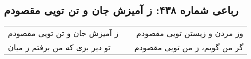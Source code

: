 \begin{center}
\section*{رباعی شماره ۴۳۸: ز آمیزش جان و تن تویی مقصودم}
\label{sec:sh438}
\begin{longtable}{l p{0.5cm} r}
ز آمیزش جان و تن تویی مقصودم
&&
وز مردن و زیستن تویی مقصودم
\\
تو دیر بزی که من برفتم ز میان
&&
گر من گویم، ز من تویی مقصودم
\\
\end{longtable}
\end{center}
